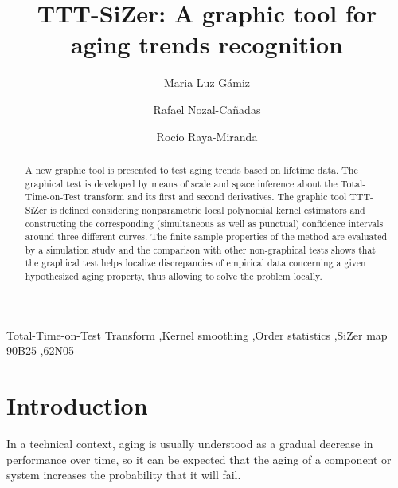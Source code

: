 \documentclass[preprint,12pt]{elsarticle}
\begin{document}
\begin{frontmatter}


\title{TTT-SiZer: A graphic tool for aging trends recognition }

\author[inst1]{Maria Luz G\'amiz}

\author[inst2]{Rafael Nozal-Ca\~nadas}

\author[inst1]{Roc\'io Raya-Miranda}



\address[inst1]{Department of Statistics and O.R., University of Granada, Spain}
\address[inst2]{Department of Computer Science, UiT-The Arctic University of Norway , Norway}



\begin{abstract}
A new graphic tool is presented to test aging trends based on lifetime data.  The graphical test is developed by means of scale and space inference about the Total-Time-on-Test transform and its first and second derivatives. The graphic tool TTT-SiZer is defined considering nonparametric local polynomial kernel estimators and constructing the corresponding (simultaneous as well as punctual) confidence intervals around three different curves. The finite sample properties of the method are evaluated by a simulation study and the comparison with other non-graphical tests shows that the graphical test helps localize discrepancies of empirical data concerning a given hypothesized aging property, thus allowing to solve the problem locally. 
\end{abstract}

\begin{keyword}
Total-Time-on-Test Transform \sep Kernel smoothing \sep Order statistics \sep SiZer map
\MSC[2010] 90B25 \sep  62N05
\end{keyword}

\end{frontmatter}

\linenumbers

\section{Introduction}

In a technical context, aging is usually understood as a gradual decrease in performance over time, so it can be expected that the aging of a component or system increases the probability that it will fail. 
\end{document}
